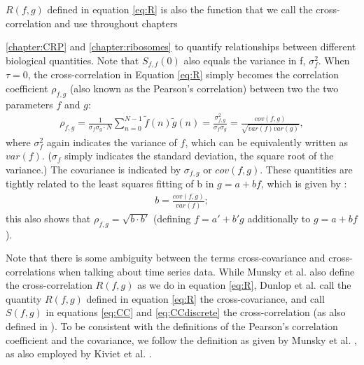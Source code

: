 $R(f,g)$ defined in equation \ref{eq:R} is also the function that we call the cross-correlation and use throughout chapters {\ref{chapter:CRP} and \ref{chapter:ribosomes} to quantify relationships between different biological quantities.
%
Note that $S_{f,f}(0)$ also equals the variance in f, $\sigma^2_f$. 
%
When $\tau=0$, the cross-correlation in Equation \ref{eq:R} simply becomes the correlation coefficient $\rho_{f,g}$ (also known as the Pearson's correlation) between two the two parameters $f$ and $g$:
%
%
\begin{align}
	\label{correlationCoefficient}
	\rho_{f,g}=		
	\frac{1}{\sigma_f \sigma_g \cdot N} 
	\sum_{n=0}^{N-1} {\tilde{f}(n) \tilde{g}(n)}
	=
	\frac{\sigma^2_{f,g}}{\sigma_f \sigma_g}
	=
	\frac{cov(f,g)}{\sqrt{var(f)var(g)}},
\end{align}
where $\sigma^2_f$ again indicates the variance of $f$, which can be equivalently written as $var(f)$. ($\sigma_f$ simply indicates the standard deviation, the square root of the variance.) The covariance is indicated by $\sigma_{f,g}$ or $cov(f,g)$.
%
%
%
These quantities are tightly related to the least squares fitting of b in $g=a+bf$, which is given by \cite[see lemma "Correlation Coefficient"]{Weisstein2018}:
\begin{align}
b = \frac{cov(f,g)}{var(f)};
\end{align}
this also shows that $\rho_{f,g} = \sqrt { b \cdot b' }$ (defining $f=a'+b'g$ additionally to $g=a+bf$).

Note that there is some ambiguity between the terms cross-covariance and cross-correlations when talking about time series data. 
While Munsky et al. \cite{Munsky2012} also define the cross-correlation $R(f,g)$ as we do in equation \ref{eq:R}, Dunlop et al. \cite{Dunlop2008} call the quantity $R(f,g)$ defined in equation \ref{eq:R} the cross-covariance, and call $S(f,g)$ in equations \ref{eq:CC} and \ref{eq:CCdiscrete} the cross-correlation (as also defined in \cite[see lemma "Cross-Correlation"]{Weisstein2018}). To be consistent with the definitions of the Pearson's correlation coefficient and the covariance, we follow the definition as given by Munsky et al. \cite{Munsky2012}, as also employed by Kiviet et al. \cite{Kiviet2010, Kiviet2014}.




}
